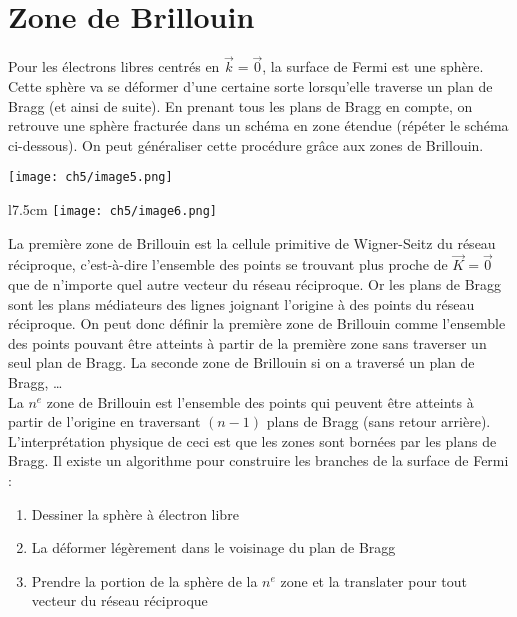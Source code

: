 	\section{Zone de Brillouin}
	Pour les électrons libres centrés en $\vec{k}=\vec 0$, la surface de Fermi 
	est une sphère. Cette sphère va se déformer d'une certaine sorte lorsqu'elle 
	traverse un plan de Bragg (et ainsi de suite). En prenant tous les plans de 
	Bragg en compte, on retrouve une sphère fracturée dans un schéma en zone 
	étendue (répéter le schéma ci-dessous). On peut généraliser cette procédure 
	grâce aux zones de Brillouin.
	
	\begin{center}
	\texttt{[image: ch5/image5.png]}
	\end{center}

	\begin{wrapfigure}[15]{l}{7.5cm}
	\vspace{-0.5cm}
	\texttt{[image: ch5/image6.png]}
	\end{wrapfigure}	
	La première zone de Brillouin est la cellule primitive de Wigner-Seitz du 
	réseau réciproque, c'est-à-dire l'ensemble des points se trouvant plus 
	proche de $\vec{K}=\vec{0}$ que de n'importe quel autre vecteur  du réseau 
	réciproque. Or les plans de Bragg sont les plans médiateurs des lignes 
	joignant l'origine à des points du réseau réciproque. On peut donc définir 
	la première zone de Brillouin comme l'ensemble des points pouvant être 
	atteints à partir de la première zone sans traverser un seul plan de Bragg. 
	La seconde zone de Brillouin si on a traversé un plan de Bragg, \dots\\
	
	La $n^e$ zone de Brillouin est l'ensemble des points qui peuvent être 
	atteints à partir de l'origine en traversant $(n-1)$ plans de Bragg 
	(sans retour arrière). L'interprétation physique de ceci est que les 
	zones sont bornées par les plans de Bragg. Il existe un algorithme 
	pour construire les branches de la surface de Fermi :
	\begin{enumerate}
	\item Dessiner la sphère à électron libre
	\item La déformer légèrement dans le voisinage du plan de Bragg
	\item Prendre la portion de la sphère de la $n^e$ zone et la translater 
	pour tout vecteur du réseau réciproque
	\end{enumerate}
	
